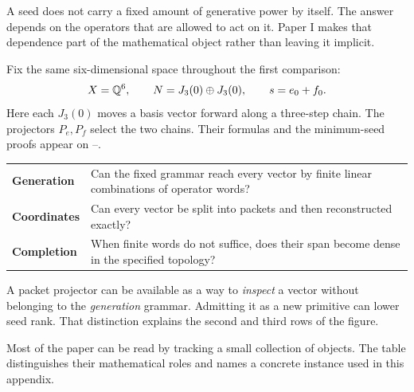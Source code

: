 
A seed does not carry a fixed amount of generative power by itself. The answer depends on the operators that are allowed to act on it. Paper I makes that dependence part of the mathematical object rather than leaving it implicit.

Fix the same six-dimensional space throughout the first comparison:
\[
X=\mathbb Q^6,\qquad N=J_3(0)\oplus J_3(0),\qquad
s=e_0+f_0.
\]
Here each $J_3(0)$ moves a basis vector forward along a three-step chain. The projectors $P_e,P_f$ select the two chains. Their formulas and the minimum-seed proofs appear on --.


\begin{tabularx}{\linewidth}{@{}p{.18\linewidth}Y@{}}
\textbf{Generation} & Can the fixed grammar reach every vector by finite linear combinations of operator words?\\[4pt]
\textbf{Coordinates} & Can every vector be split into packets and then reconstructed exactly?\\[4pt]
\textbf{Completion} & When finite words do not suffice, does their span become dense in the specified topology?
\end{tabularx}

A packet projector can be available as a way to \emph{inspect} a vector without belonging to the \emph{generation} grammar. Admitting it as a new primitive can lower seed rank. That distinction explains the second and third rows of the figure.


Most of the paper can be read by tracking a small collection of objects. The table distinguishes their mathematical roles and names a concrete instance used in this appendix.

